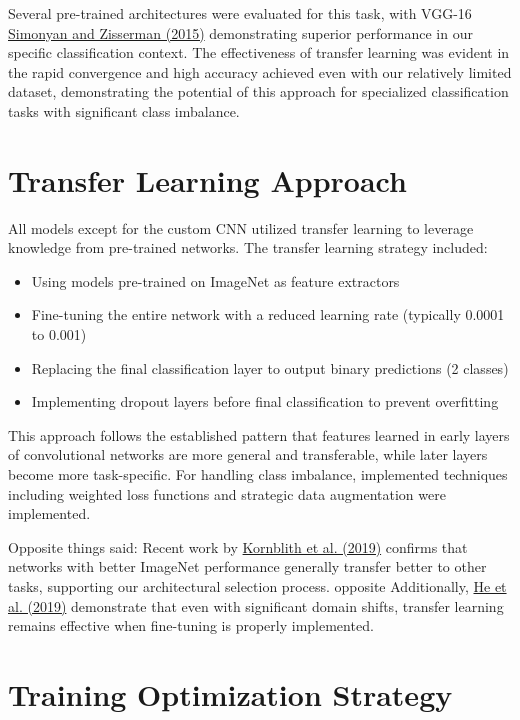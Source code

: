 \documentclass[a4paper,12pt]{article}
\begin{document}
Several pre-trained architectures were evaluated for this task, with VGG-16 \href{https://arxiv.org/abs/1409.1556}{Simonyan and Zisserman (2015)} demonstrating superior performance in our specific classification context. The effectiveness of transfer learning was evident in the rapid convergence and high accuracy achieved even with our relatively limited dataset, demonstrating the potential of this approach for specialized classification tasks with significant class imbalance.

\section{Transfer Learning Approach}

All models except for the custom CNN utilized transfer learning to leverage knowledge from pre-trained networks. The transfer learning strategy included:

\begin{itemize}
    \item Using models pre-trained on ImageNet as feature extractors
    \item Fine-tuning the entire network with a reduced learning rate (typically 0.0001 to 0.001)
    \item Replacing the final classification layer to output binary predictions (2 classes)
    \item Implementing dropout layers before final classification to prevent overfitting
\end{itemize}

This approach follows the established pattern that features learned in early layers of convolutional networks are more general and transferable, while later layers become more task-specific. For handling class imbalance, implemented techniques including weighted loss functions and strategic data augmentation were implemented.


 Opposite things said:
 Recent work by \href{https://arxiv.org/abs/1805.08974}{Kornblith et al. (2019)} confirms that networks with better ImageNet performance generally transfer better to other tasks, supporting our architectural selection process. opposite
 Additionally, \href{https://arxiv.org/abs/1811.07056}{He et al. (2019)} demonstrate that even with significant domain shifts, transfer learning remains effective when fine-tuning is properly implemented.


\section{Training Optimization Strategy} 
\end{document}
